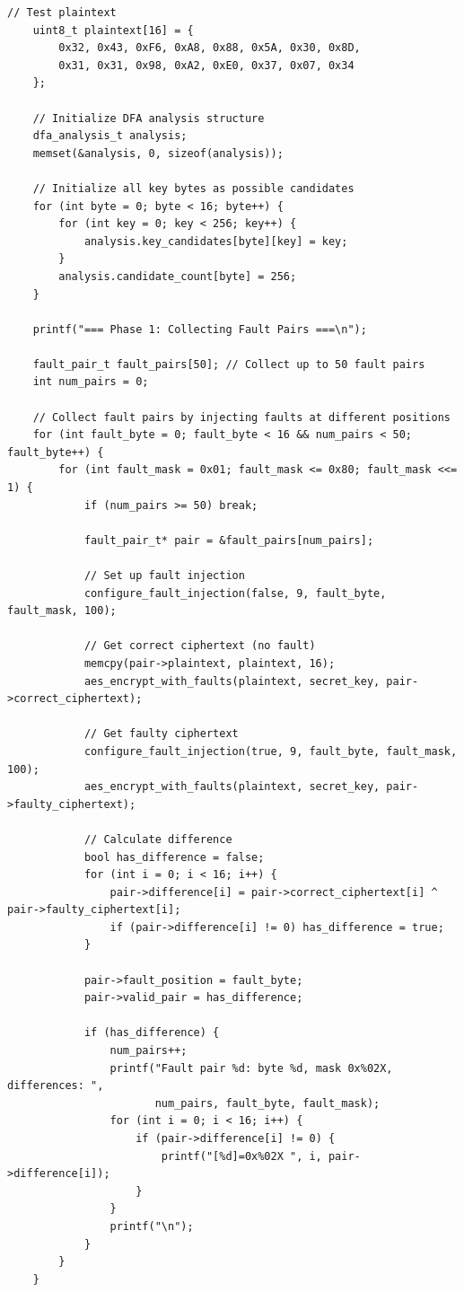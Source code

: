 \documentclass[12pt,a4paper]{article}
\begin{document}
\begin{lstlisting}[caption={Complete DFA Key Recovery Attack}]
    // Test plaintext
    uint8_t plaintext[16] = {
        0x32, 0x43, 0xF6, 0xA8, 0x88, 0x5A, 0x30, 0x8D,
        0x31, 0x31, 0x98, 0xA2, 0xE0, 0x37, 0x07, 0x34
    };
    
    // Initialize DFA analysis structure
    dfa_analysis_t analysis;
    memset(&analysis, 0, sizeof(analysis));
    
    // Initialize all key bytes as possible candidates
    for (int byte = 0; byte < 16; byte++) {
        for (int key = 0; key < 256; key++) {
            analysis.key_candidates[byte][key] = key;
        }
        analysis.candidate_count[byte] = 256;
    }
    
    printf("=== Phase 1: Collecting Fault Pairs ===\n");
    
    fault_pair_t fault_pairs[50]; // Collect up to 50 fault pairs
    int num_pairs = 0;
    
    // Collect fault pairs by injecting faults at different positions
    for (int fault_byte = 0; fault_byte < 16 && num_pairs < 50; fault_byte++) {
        for (int fault_mask = 0x01; fault_mask <= 0x80; fault_mask <<= 1) {
            if (num_pairs >= 50) break;
            
            fault_pair_t* pair = &fault_pairs[num_pairs];
            
            // Set up fault injection
            configure_fault_injection(false, 9, fault_byte, fault_mask, 100);
            
            // Get correct ciphertext (no fault)
            memcpy(pair->plaintext, plaintext, 16);
            aes_encrypt_with_faults(plaintext, secret_key, pair->correct_ciphertext);
            
            // Get faulty ciphertext  
            configure_fault_injection(true, 9, fault_byte, fault_mask, 100);
            aes_encrypt_with_faults(plaintext, secret_key, pair->faulty_ciphertext);
            
            // Calculate difference
            bool has_difference = false;
            for (int i = 0; i < 16; i++) {
                pair->difference[i] = pair->correct_ciphertext[i] ^ pair->faulty_ciphertext[i];
                if (pair->difference[i] != 0) has_difference = true;
            }
            
            pair->fault_position = fault_byte;
            pair->valid_pair = has_difference;
            
            if (has_difference) {
                num_pairs++;
                printf("Fault pair %d: byte %d, mask 0x%02X, differences: ", 
                       num_pairs, fault_byte, fault_mask);
                for (int i = 0; i < 16; i++) {
                    if (pair->difference[i] != 0) {
                        printf("[%d]=0x%02X ", i, pair->difference[i]);
                    }
                }
                printf("\n");
            }
        }
    }
    

\end{lstlisting}
\end{document}
